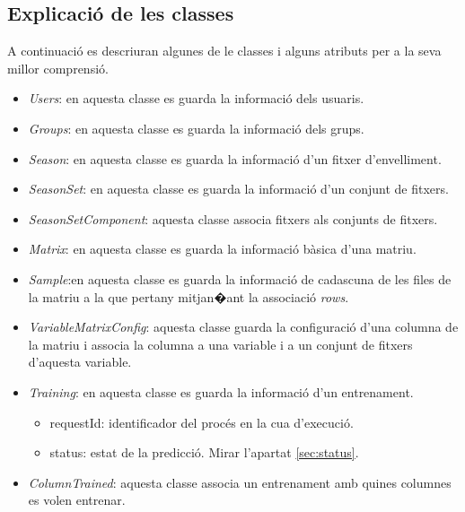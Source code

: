 \subsection{Explicaci\'{o} de les classes}
A continuaci\'{o} es descriuran algunes de le classes i alguns atributs per a la seva millor comprensi\'{o}.
\begin{itemize}
\item \textit{Users}: en aquesta classe es guarda la informaci\'{o} dels usuaris.

\item \textit{Groups}: en aquesta classe es guarda la informaci\'{o} dels grups. 

\item \textit{Season}: en aquesta classe es guarda la informaci\'{o} d'un fitxer d'envelliment.

\item \textit{SeasonSet}: en aquesta classe es guarda la informaci\'{o} d'un conjunt de fitxers.

\item \textit{SeasonSetComponent}: aquesta classe associa fitxers als conjunts de fitxers.

\item \textit{Matrix}: en aquesta classe es guarda la informaci\'{o} b\`{a}sica d'una matriu.

\item \textit{Sample}:en aquesta classe es guarda la informaci\'{o} de cadascuna de les files de la matriu a la que pertany mitjan�ant la associaci\'{o} \textit{rows}.

\item \textit{VariableMatrixConfig}: aquesta classe guarda la configuraci\'{o} d'una columna de la matriu i associa la columna a una variable i a un conjunt de fitxers d'aquesta variable.

\item \textit{Training}: en aquesta classe es guarda la informaci\'{o} d'un entrenament.
\begin{itemize}
\item requestId: identificador del proc\'{e}s en la cua d'execuci\'{o}.
\item status: estat de la predicci\'{o}. Mirar l'apartat \ref{sec:status}.
\end{itemize}

\item \textit{ColumnTrained}: aquesta classe associa un entrenament amb quines columnes es volen entrenar.


\end{itemize}
